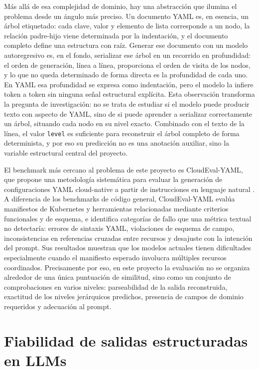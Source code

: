 Más allá de esa complejidad de dominio, hay una abstracción que ilumina el problema desde un ángulo más preciso. Un documento YAML es, en esencia, un árbol etiquetado: cada clave, valor y elemento de lista corresponde a un nodo, la relación padre-hijo viene determinada por la indentación, y el documento completo define una estructura con raíz. Generar ese documento con un modelo autoregresivo es, en el fondo, serializar ese árbol en un recorrido en profundidad: el orden de generación, línea a línea, proporciona el orden de visita de los nodos, y lo que no queda determinado de forma directa es la profundidad de cada uno. En YAML esa profundidad se expresa como indentación, pero el modelo la infiere token a token sin ninguna señal estructural explícita. Esta observación transforma la pregunta de investigación: no se trata de estudiar si el modelo puede producir texto con aspecto de YAML, sino de si puede aprender a serializar correctamente un árbol, situando cada nodo en su nivel exacto. Combinado con el texto de la línea, el valor \texttt{level} es suficiente para reconstruir el árbol completo de forma determinista, y por eso su predicción no es una anotación auxiliar, sino la variable estructural central del proyecto.

El benchmark más cercano al problema de este proyecto es CloudEval-YAML, que propone una metodología sistemática para evaluar la generación de configuraciones YAML cloud-native a partir de instrucciones en lenguaje natural \citep{xu2024cloudevalyaml}. A diferencia de los benchmarks de código general, CloudEval-YAML evalúa manifiestos de Kubernetes y herramientas relacionadas mediante criterios funcionales y de esquema, e identifica categorías de fallo que una métrica textual no detectaría: errores de sintaxis YAML, violaciones de esquema de campo, inconsistencias en referencias cruzadas entre recursos y desajuste con la intención del prompt. Sus resultados muestran que los modelos actuales tienen dificultades especialmente cuando el manifiesto esperado involucra múltiples recursos coordinados. Precisamente por eso, en este proyecto la evaluación no se organiza alrededor de una única puntuación de similitud, sino como un conjunto de comprobaciones en varios niveles: parseabilidad de la salida reconstruida, exactitud de los niveles jerárquicos predichos, presencia de campos de dominio requeridos y adecuación al prompt.

\section{Fiabilidad de salidas estructuradas en LLMs}
\label{sec:estado-arte-salidas-estructuradas}

